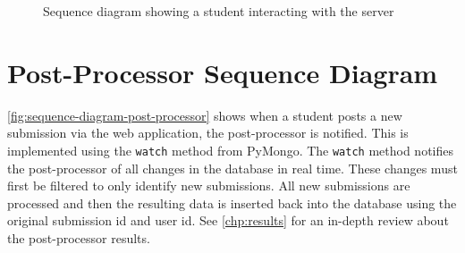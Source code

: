 \vspace*{\fill}

\begin{figure}[H]
  \centering
  \caption[Student-server sequence diagram]{Sequence diagram showing a student interacting with the server}
  \label{fig:sequence-diagram-student-server}
\end{figure}

\vspace*{\fill}

\newpage

\section{Post-Processor Sequence Diagram}
\autoref{fig:sequence-diagram-post-processor} shows when a student posts a new submission via the web application, the post-processor is notified. This is implemented using the \texttt{watch} method from PyMongo. The \texttt{watch} method notifies the post-processor of all changes in the database in real time. These changes must first be filtered to only identify new submissions. All new submissions are processed and then the resulting data is inserted back into the database using the original submission id and user id. See \autoref{chp:results} for an in-depth review about the post-processor results.

